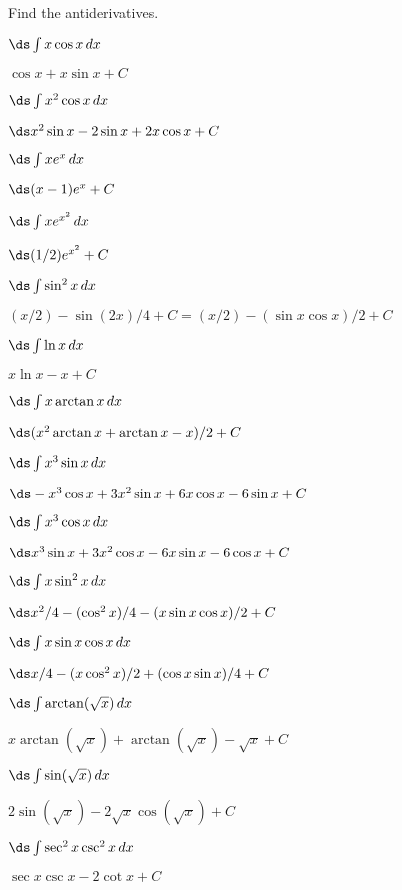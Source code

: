 \begin{exercises}

Find the antiderivatives.

\twocol

\exercise $\ds\int x\cos x\,dx$
\begin{answer} $\cos x+x\sin x+C$
\end{answer}

\exercise $\ds\int x^2\cos x\,dx$
\begin{answer} $\ds x^2\sin x-2 \sin x+2x\cos x +C$
\end{answer}

\exercise $\ds\int xe^x\,dx$
\begin{answer} $\ds (x-1)e^x +C$
\end{answer}

\exercise $\ds\int xe^{x^2}\,dx$
\begin{answer} $\ds (1/2)e^{x^2} +C$
\end{answer}

\exercise $\ds\int \sin^2 x\,dx$
\begin{answer} $(x/2)-\sin(2x)/4 +C=$\hfill\break$(x/2)-(\sin x\cos x)/2+C$
\end{answer}

\exercise $\ds\int \ln x\,dx$
\begin{answer} $x\ln x-x +C$
\end{answer}

\exercise $\ds\int x\arctan x\,dx$
\begin{answer} $\ds (x^2\arctan x +\arctan x -x)/2+C$
\end{answer}

\exercise $\ds\int x^3\sin x\,dx$
\begin{answer} $\ds -x^3\cos x+3x^2\sin x+6x\cos x-6\sin x+C$
\end{answer}

\exercise $\ds\int x^3\cos x\,dx$
\begin{answer} $\ds x^3\sin x+3x^2\cos x-6x\sin x-6\cos x+C$
\end{answer}

\exercise $\ds\int x\sin^2 x\,dx$
\begin{answer} $\ds x^2/4-(\cos^2 x)/4-(x\sin x\cos x)/2+C$
\end{answer}

\exercise $\ds\int x\sin x\cos x\,dx$
\begin{answer} $\ds x/4-(x\cos^2 x)/2+(\cos x\sin x)/4+C$
\end{answer}

\exercise $\ds\int \arctan(\sqrt x)\,dx$
\begin{answer} $x\arctan(\sqrt x)+\arctan(\sqrt x)-\sqrt{x}+C$
\end{answer}

\exercise $\ds\int \sin(\sqrt x)\,dx$
\begin{answer} $2\sin(\sqrt x)-2\sqrt x\cos(\sqrt x)+C$
\end{answer}

\exercise $\ds\int\sec^2 x\csc^2 x\,dx$
\begin{answer} $\sec x\csc x-2\cot x+C$
\end{answer}

\endtwocol

\end{exercises}
